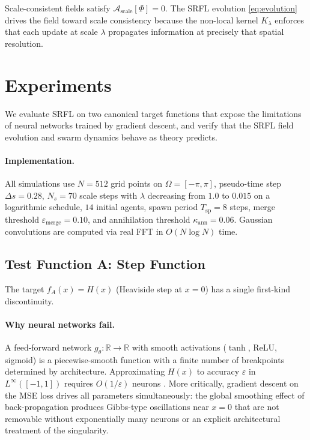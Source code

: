 \documentclass[12pt,a4paper]{article}
\theoremstyle{plain}
\theoremstyle{definition}
\theoremstyle{remark}
\newcommand{\cA}{\mathcal{A}}
\newcommand{\R}{\mathbb{R}}
\newcommand{\eps}{\varepsilon}
\begin{document}
Scale-consistent fields satisfy $\cA_\text{scale}[\Phi] = 0$.  The SRFL
evolution \eqref{eq:evolution} drives the field toward scale consistency
because the non-local kernel $K_\lambda$ enforces that each update at
scale $\lambda$ propagates information at precisely that spatial resolution.

\section{Experiments}
\label{sec:experiments}

We evaluate SRFL on two canonical target functions that expose the
limitations of neural networks trained by gradient descent, and verify
that the SRFL field evolution and swarm dynamics behave as theory predicts.

\paragraph{Implementation.}
All simulations use $N = 512$ grid points on $\Omega = [-\pi, \pi]$,
pseudo-time step $\Delta s = 0.28$, $N_s = 70$ scale steps with
$\lambda$ decreasing from $1.0$ to $0.015$ on a logarithmic schedule,
$14$ initial agents, spawn period $T_\text{sp} = 8$ steps,
merge threshold $\eps_\text{merge} = 0.10$, and
annihilation threshold $\kappa_\text{ann} = 0.06$.
Gaussian convolutions are computed via real FFT in $O(N\log N)$ time.

\subsection{Test Function A: Step Function}

The target $f_A(x) = H(x)$ (Heaviside step at $x = 0$) has a single
first-kind discontinuity.

\paragraph{Why neural networks fail.}
A feed-forward network $g_\theta : \R \to \R$ with smooth activations
($\tanh$, ReLU, sigmoid) is a piecewise-smooth function with a finite
number of breakpoints determined by architecture.  Approximating $H(x)$
to accuracy $\eps$ in $L^\infty([-1,1])$ requires $O(1/\eps)$ neurons
\cite{cybenko1989approximation,barron1993universal}.  More critically,
gradient descent on the MSE loss drives all parameters simultaneously:
the global smoothing effect of back-propagation produces Gibbs-type
oscillations near $x=0$ that are not removable without exponentially
many neurons or an explicit architectural treatment of the singularity.
\end{document}
